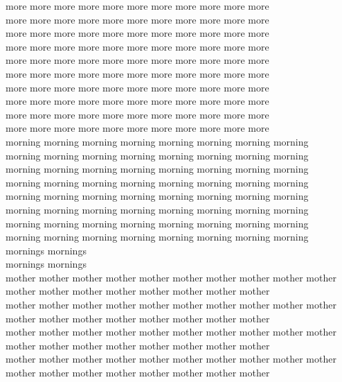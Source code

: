 more more more more more more more more more more more\\
more more more more more more more more more more more\\
more more more more more more more more more more more\\
more more more more more more more more more more more\\
more more more more more more more more more more more\\
more more more more more more more more more more more\\
more more more more more more more more more more more\\
more more more more more more more more more more more\\
more more more more more more more more more more more\\
more more more more more more more more more more more\\
morning morning morning morning morning morning morning morning\\
morning morning morning morning morning morning morning morning\\
morning morning morning morning morning morning morning morning\\
morning morning morning morning morning morning morning morning\\
morning morning morning morning morning morning morning morning\\
morning morning morning morning morning morning morning morning\\
morning morning morning morning morning morning morning morning\\
morning morning morning morning morning morning morning morning\\
mornings mornings\\
mornings mornings\\
mother mother mother mother mother mother mother mother mother mother mother mother mother mother mother mother mother mother\\
mother mother mother mother mother mother mother mother mother mother mother mother mother mother mother mother mother mother\\
mother mother mother mother mother mother mother mother mother mother mother mother mother mother mother mother mother mother\\
mother mother mother mother mother mother mother mother mother mother mother mother mother mother mother mother mother mother\\
